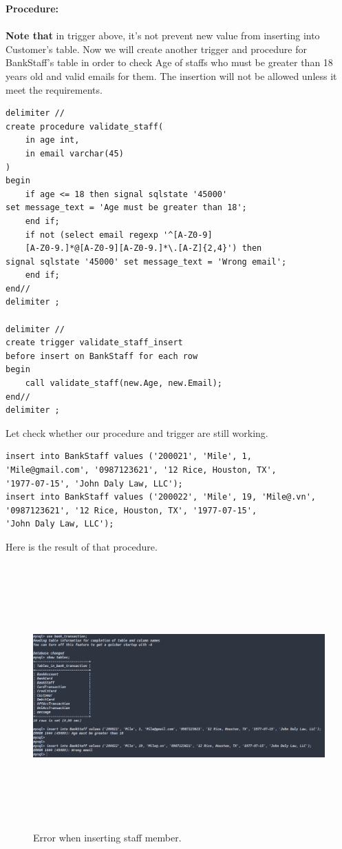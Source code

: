 \documentclass[12pt,a4paper]{article}
\begin{document}
\textbf{Procedure:}\\\\
\indent \textbf{Note that} in trigger above, it's not prevent new value from inserting into Customer's table. 
Now we will create another trigger and procedure for BankStaff's table in order to check Age of staffs who must be greater than 18 years old and valid emails for them. The insertion will not be allowed unless it meet the requirements.
\begin{verbatim}
delimiter //
create procedure validate_staff(
    in age int,
    in email varchar(45)
)
begin
    if age <= 18 then signal sqlstate '45000' 
set message_text = 'Age must be greater than 18';
    end if;
    if not (select email regexp '^[A-Z0-9]
    [A-Z0-9.]*@[A-Z0-9][A-Z0-9.]*\.[A-Z]{2,4}') then
signal sqlstate '45000' set message_text = 'Wrong email';
    end if;
end//
delimiter ;

delimiter //
create trigger validate_staff_insert
before insert on BankStaff for each row
begin
    call validate_staff(new.Age, new.Email);
end//
delimiter ;
\end{verbatim}

\indent Let check whether our procedure and trigger are still working.
\begin{verbatim}
insert into BankStaff values ('200021', 'Mile', 1, 
'Mile@gmail.com', '0987123621', '12 Rice, Houston, TX', 
'1977-07-15', 'John Daly Law, LLC');
insert into BankStaff values ('200022', 'Mile', 19, 'Mile@.vn',
'0987123621', '12 Rice, Houston, TX', '1977-07-15',
'John Daly Law, LLC');
\end{verbatim}
\indent Here is the result of that procedure.

\begin{figure}[H]
    \centering
    \includegraphics[width=5in,height=4in]{Picture/data.png}
    \caption{Error when inserting staff member.}
\end{figure}
\end{document}
